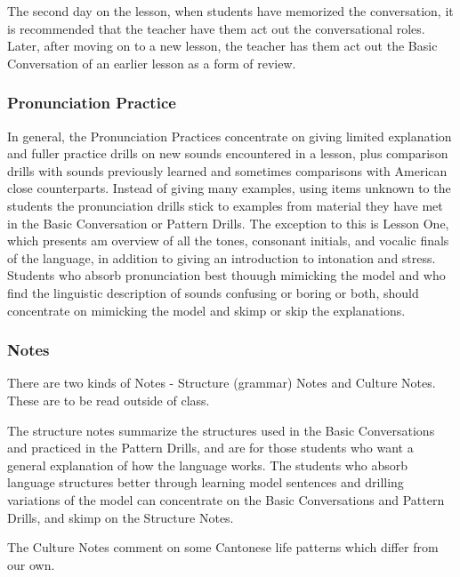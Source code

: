 The second day on the lesson, when students have memorized the conversation, it is recommended that the teacher have them act out the conversational roles. Later, after moving on to a new lesson, the teacher has them act out the Basic Conversation of an earlier lesson as a form of review.


\subsubsection{Pronunciation Practice}

In general, the Pronunciation Practices concentrate on giving limited explanation and fuller practice drills on new sounds encountered in a lesson, plus comparison drills with sounds previously learned and sometimes comparisons with American close counterparts. Instead of giving many examples, using items unknown to the students the pronunciation drills stick to examples from material they have met in the Basic Conversation or Pattern Drills. The exception to this is Lesson One, which presents am overview of all the tones, consonant initials, and vocalic finals of the language, in addition to giving an introduction to intonation and stress. Students who absorb pronunciation best thouugh mimicking the model and who find the linguistic description of sounds confusing or boring or both, should concentrate on mimicking the model and skimp or skip the explanations.


\subsubsection{Notes}

There are two kinds of Notes - Structure (grammar) Notes and Culture Notes. These are to be read outside of class.

The structure notes summarize the structures used in the Basic Conversations and practiced in the Pattern Drills, and are for those students who want a general explanation of how the language works. The students who absorb language structures better through learning model sentences and drilling variations of the model can concentrate on the Basic Conversations and Pattern Drills, and skimp on the Structure Notes.

The Culture Notes comment on some Cantonese life patterns which differ from our own.

